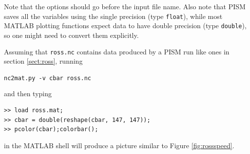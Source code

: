 \documentclass[11pt,final]{amsart}
\begin{document}
Note that the options should go before the input file name. Also note that PISM saves all the variables using the single precision (type \verb|float|), while most MATLAB plotting functions expect data to have double precision (type \verb|double|), so one might need to convert them explicitly.

Assuming that \verb|ross.nc| contains data produced by a PISM run like ones in section \ref{sect:ross}, running

\verb|nc2mat.py -v cbar ross.nc|

\noindent and then typing
\begin{verbatim}
>> load ross.mat;
>> cbar = double(reshape(cbar, 147, 147));
>> pcolor(cbar);colorbar();
\end{verbatim}
in the MATLAB shell will produce a picture similar to Figure \ref{fig:rossspeed}.

\label{sect:index}
\printindex
\end{document}
